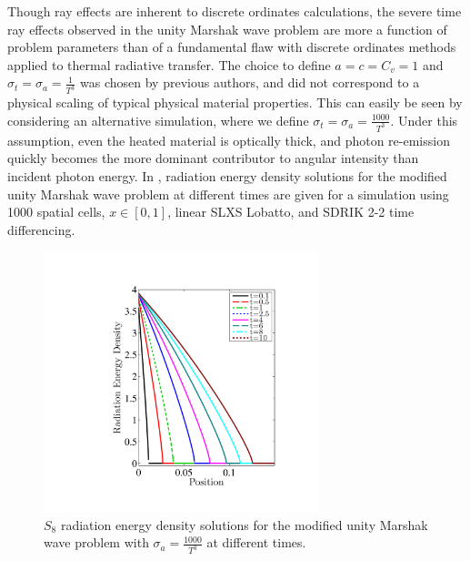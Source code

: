 Though ray effects are inherent to discrete ordinates calculations, the severe time ray effects observed in the unity Marshak wave problem are more a function of problem parameters than of a fundamental flaw with discrete ordinates methods applied to thermal radiative transfer.
The choice to define $a=c=C_v=1$ and $\sigma_t = \sigma_a = \frac{1}{T^3}$ was chosen by previous authors, and did not correspond to a physical scaling of typical physical material properties.
This can easily be seen by considering an alternative simulation, where we define $\sigma_t = \sigma_a = \frac{1000}{T^3}$.
Under this assumption, even the heated material is optically thick, and photon re-emission quickly becomes the more dominant contributor to angular intensity than incident photon energy.
In , radiation energy density solutions for the modified unity Marshak wave problem at different times are given for a simulation using 1000 spatial cells, $x\in[0,1]$, linear SLXS Lobatto, and SDRIK 2-2 time differencing.
\begin{figure}[!htp]
\centering
\includegraphics[width=8cm,trim=1in  0.5in 1in 0.75in,clip=true]{chapter6_grey_radtran/Dissertation_Data/More_Times_P1_S8_Time_Ray_Effects_Radiation_Cv1_SigA1000.pdf}
\caption{$S_{8}$ radiation energy density solutions for the modified unity Marshak wave problem with $\sigma_a = \frac{1000}{T^3}$ at different times.}
\label{fig:sig_a_1000_radiation}
\end{figure}
